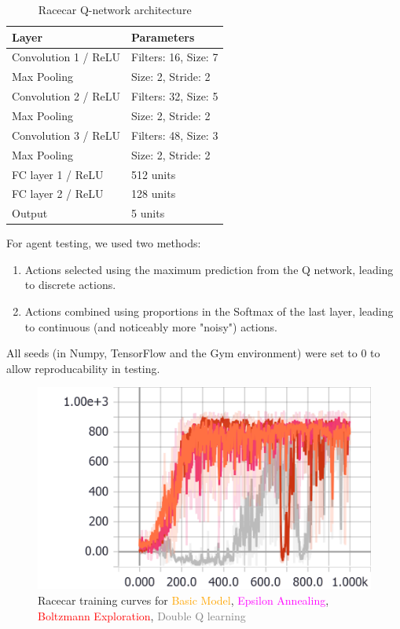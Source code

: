 \documentclass[a4paper, 11pt, conference]{ieeeconf}      %
\begin{document}
\begin{table}
  \centering
  \caption{Racecar Q-network architecture}
  \label{table:agent1}
  \begin{tabular}{ll}
  Layer & Parameters \\ \hline
  Convolution 1 / ReLU & Filters: 16, Size: 7 \\
  Max Pooling & Size: 2, Stride: 2\\
  Convolution 2 / ReLU & Filters: 32, Size: 5 \\
  Max Pooling & Size: 2, Stride: 2\\
  Convolution 3 / ReLU & Filters: 48, Size: 3 \\
  Max Pooling & Size: 2, Stride: 2\\
  FC layer 1 / ReLU & 512 units\\
  FC layer 2 / ReLU & 128 units\\
  Output & 5 units\\
  \end{tabular}
  \end{table}

For agent testing, we used two methods:

\begin{enumerate}
	\item Actions selected using the maximum prediction from the Q network, leading to discrete actions.
	\item Actions combined using proportions in the Softmax of the last layer, leading to continuous (and noticeably more "noisy") actions.
\end{enumerate}

All seeds (in Numpy, TensorFlow and the Gym environment) were set to 0 to allow reproducability in testing.

\begin{figure}
  \includegraphics[width=\linewidth]{figs/racecar_train_1234.png}
  \caption{Racecar training curves for \textcolor{orange}{Basic Model}, \textcolor{magenta}{Epsilon Annealing}, \textcolor{red}{Boltzmann Exploration}, \textcolor{gray}{Double Q learning}}
  \label{fig:train1234}
\end{figure}
\end{document}

